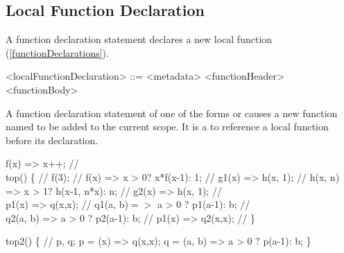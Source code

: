 \documentclass[makeidx]{article}
\begin{document}
\subsection{Local Function Declaration}

\LMHash{}%
A function declaration statement declares a new local function
(\ref{functionDeclarations}).

\begin{grammar}
<localFunctionDeclaration> ::= <metadata> <functionHeader> <functionBody>
\end{grammar}

\LMHash{}%
A function declaration statement of one of the forms
or
causes a new function named \id{} to be added to the current scope.
It is a
 to reference a local function before its declaration.


\begin{dartCode}
f(x) => x++; // 
\\
top() \{ // 
  f(3); // 
  f(x) => x > 0? x*f(x-1): 1; // 
  g1(x) => h(x, 1); // 
  h(x, n) => x > 1? h(x-1, n*x): n; // 
  g2(x) => h(x, 1); // 
\\
  p1(x) => q(x,x); // 
  q1(a, b)$ =>$ a > 0 ? p1(a-1): b; // 
\\
  q2(a, b) => a > 0 ? p2(a-1): b; // 
  p1(x) => q2(x,x); // 
\}
\end{dartCode}


\begin{dartCode}
top2() \{ // 
  \VAR{} p, q;
  p = (x) => q(x,x);
  q = (a, b) => a > 0 ? p(a-1): b;
\}
\end{dartCode}
\end{document}
